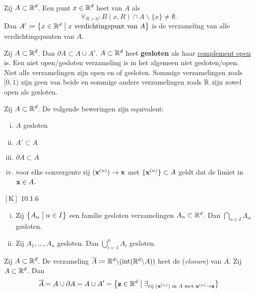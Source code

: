 \documentclass{2wa40summary}
\begin{document}
	 Zij $A \subset \mathbb{R}^d$. Een punt $x \in \mathbb{R}^d$ heet  van $A$ als \[\forall _{R>0}:B(x,R)\cap  A \backslash\{x\} \neq \emptyset.\]
	Dan $A'\coloneqq \big\{ x \in \mathbb{R}^d \bigm| x \text{ verdichtingspunt van } A\big\}$ is de verzameling van
	alle verdichtingspunten van $A$.
	
	\lemma Zij $A \subset \mathbb{R}^d$. Dan $\partial A \subset A\cup A'$.
	 $A \subset \mathbb{R}^d$ heet \textbf{gesloten} als haar \underline{complement open} is.
	\valkuil Een niet open/gesloten verzameling is in het algemeen niet gesloten/open.
	Niet alle verzamelingen zijn open en of gesloten. Sommige verzamelingen zoals $[0,1)$ zijn geen van beide
	en sommige andere verzamelingen zoals $\mathbb{R}$ zijn zowel open als gesloten.
	
	 Zij $A \subset \mathbb{R}^d$. De volgende beweringen zijn equivalent:
	\begin{enumerate}[(i)]
		\item $A$ gesloten
		\item $A'\subset A$
		\item $\partial A \subset A$
		\item voor elke convergente rij $({\textbf{x}}^{(n)})\to{\textbf{x}}$ met $\lbrace{\textbf{x}}^{(n)}\rbrace\subset A$ geldt dat de limiet in ${\textbf{x}}\in A$.%
	\end{enumerate}
	
	\theorem $\left[\text{K}\right]$ 10.1.6
	\begin{enumerate}[(i)]
		\item Zij $\big\{ A_\alpha \bigm| \alpha \in I \big\}$ een familie gesloten verzamelingen $A_\alpha \subset \mathbb{R}^d$. Dan $\bigcap_{\alpha \in I}A_\alpha$ gesloten.
		\item Zij $A_1, \dots ,A_n$ gesloten. Dan $\bigcup_{i=1}^n A_i$ gesloten.
	\end{enumerate}
	
	 Zij $A \subset \mathbb{R}^d$. De verzameling $\overline{A}\coloneqq  \mathbb{R}^d \backslash (\operatorname{\mathop{int}} (\mathbb{R}^d \backslash A))$ heet de  (\textit{closure}) van $A$.
	Zij $A \subset \mathbb{R}^d$. Dan
	\[\overline{A}= A \cup \partial A = A \cup A'= \big\{{\textbf{z}} \in \mathbb{R}^d \bigm| \exists _{\text{rij } ({\textbf{x}}^{(n)}) \text{ in } A \text{ met } {\textbf{x}}^{(n)} \to {\textbf{z}}} \big\}\]
	
\end{document}
